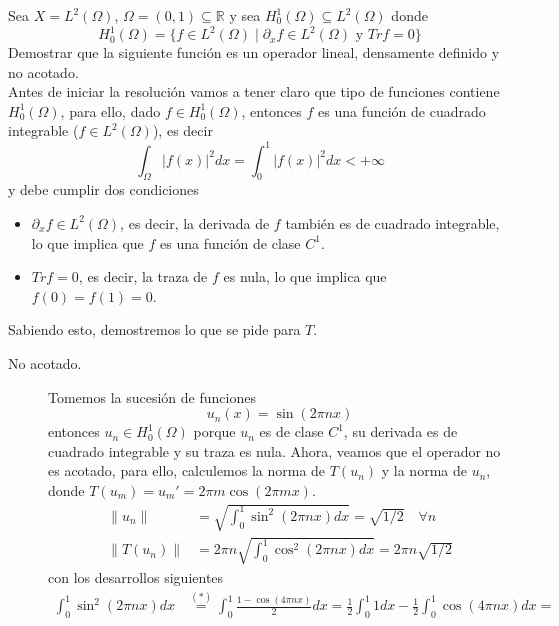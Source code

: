 \begin{ejercicio}
    Sea $X=L^2(\Omega)$, $\Omega = (0,1) \subseteq \mathbb{R}$ y sea $H^1_0(\Omega) \subseteq L^2(\Omega)$ donde 
    \begin{equation*}
        H^1_0(\Omega) = \{ f \in L^2(\Omega) \mid \partial_x f \in L^2(\Omega) \text{ y } Tr f = 0 \}
    \end{equation*}
    Demostrar que la siguiente función
    es un operador lineal, densamente definido y no acotado. \\

    \noindent
    Antes de iniciar la resolución vamos a tener claro que tipo de funciones contiene $H_0^1(\Omega)$, para ello, dado $f \in H_0^1(\Omega)$, entonces $f$ es una función de cuadrado integrable ($f\in L^2(\Omega)$), es decir
    \begin{equation*}
        \int_\Omega |f(x)|^2 dx=\int_0^1 |f(x)|^2 dx < +\infty
    \end{equation*}
    y debe cumplir dos condiciones
    \begin{itemize}
        \item $\partial_x f \in L^2(\Omega)$, es decir, la derivada de $f$ también es de cuadrado integrable, lo que implica que $f$ es una función de clase $C^1$.
        \item $Tr f = 0$, es decir, la traza de $f$ es nula, lo que implica que $f(0) = f(1) = 0$.
    \end{itemize}
    Sabiendo esto, demostremos lo que se pide para $T$.
    \begin{description}
        \item[No acotado.] Tomemos la sucesión de funciones 
        $$u_n(x) = \sin(2\pi n x)$$
        entonces $u_n \in H^1_0(\Omega)$ porque $u_n$ es de clase $C^1$, su derivada es de cuadrado integrable y su traza es nula. Ahora, veamos que el operador no es acotado, para ello, calculemos la norma de $T(u_n)$ y la norma de $u_n$, donde $T(u_m) = u_m' = 2\pi m \cos(2\pi m x)$.
        \begin{align*}
            \|u_n\| &= \sqrt{\int_0^1 \sin^2(2\pi n x) dx} =\sqrt{1/2} \quad \forall n \\
            \|T(u_n)\| &= 2\pi n \sqrt{\int_0^1 \cos^2(2\pi n x) dx} = 2\pi n \sqrt{1/2}
        \end{align*}
        con los desarrollos siguientes
        \begin{align*}
            \int_0^1 \sin^2(2\pi n x) dx &\overset{(*)}{=} \int_0^1 \frac{1 - \cos(4\pi n x)}{2} dx= \frac{1}{2} \int_0^1 1 dx - \frac{1}{2} \int_0^1 \cos(4\pi n x) dx= \\

\end{align*}
\end{description}
\end{ejercicio}
